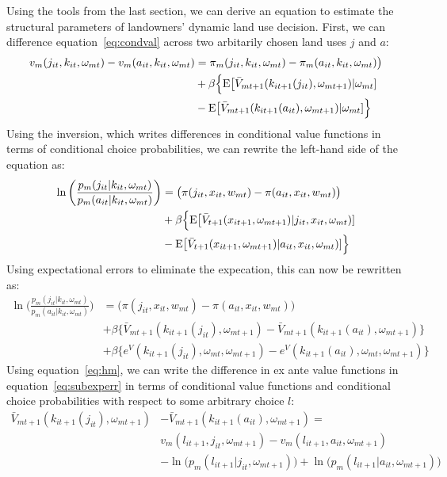 \documentclass[11pt]{article}
\newcommand{\Exp}{\textnormal{E}}
\begin{document}
Using the tools from the last section, we can derive an equation to estimate the structural parameters of landowners' dynamic land use decision. First, we can difference equation~\ref{eq:condval} across two arbitarily chosen land uses $j$ and $a$:
\begin{align*}
v_m(j_{it}, k_{it},\omega_{mt}) - v_m(a_{it}, k_{it},\omega_{mt})  &= \pi_m(j_{it},k_{it},\omega_{mt}) - \pi_m(a_{it},k_{it},\omega_{mt}) \big) \\
	& + \beta \Big\{ \Exp\big[\bar{V}_{mt+1}(k_{it+1}(j_{it}),\omega_{mt+1}) | \omega_{mt}] \\ \nonumber
	& -  \Exp\big[\bar{V}_{mt+1}(k_{it+1}(a_{it}),\omega_{mt+1}) | \omega_{mt}] \Big\} \nonumber
\end{align*}
Using the \citet{hotzmiller} inversion, which writes differences in conditional value functions in terms of conditional choice probabilities, we can rewrite the left-hand side of the equation as:
\begin{align} \label{eq:subhm}
\ln\bigg(\frac{p_m(j_{it}|k_{it},\omega_{mt})}{p_m(a_{it}|k_{it},\omega_{mt})}\bigg) &= \big(\pi(j_{it},x_{it},w_{mt}) - \pi(a_{it},x_{it},w_{mt})\big) \\
	& + \beta \Big\{ \Exp\big[\bar{V}_{t+1}(x_{it+1},\omega_{mt+1}) | j_{it}, x_{it}, \omega_{mt})] \nonumber\\ 
	& -  \Exp\big[\bar{V}_{t+1}(x_{it+1},\omega_{mt+1}) | a_{it}, x_{it}, \omega_{mt})] \Big\} \nonumber
\end{align} 
Using expectational errors to eliminate the expecation, this can now be rewritten as:
\begin{align}  \label{eq:subexperr}
\ln\bigg(\frac{p_m(j_{it}|k_{it},\omega_{mt})}{p_m(a_{it}|k_{it},\omega_{mt})}\bigg) &= \big(\pi(j_{it},x_{it},w_{mt}) - \pi(a_{it},x_{it},w_{mt})\big) \\
	& + \beta \Big\{\bar{V}_{mt+1}(k_{it+1}(j_{it}),\omega_{mt+1}) -  \bar{V}_{mt+1}(k_{it+1}(a_{it}),\omega_{mt+1})\Big\} \nonumber \\ 
	& + \beta \Big\{e^V(k_{it+1}(j_{it}),\omega_{mt},\omega_{mt+1}) -  e^V(k_{it+1}(a_{it}),\omega_{mt},\omega_{mt+1})\Big\} \nonumber
\end{align}
Using equation~\ref{eq:hm}, we can write the difference in ex ante value functions in equation~\ref{eq:subexperr} in terms of conditional value functions and conditional choice probabilities with respect to some arbitrary choice $l$:
\begin{align}  \label{eq:diffexante}
\bar{V}_{mt+1}(k_{it+1}(j_{it}),\omega_{mt+1})& -  \bar{V}_{mt+1}(k_{it+1}(a_{it}),\omega_{mt+1}) = \\ \nonumber
& v_m(l_{it+1},j_{it},\omega_{mt+1}) - v_m(l_{it+1},a_{it},\omega_{mt+1})\\ 
& - \ln\big(p_m(l_{it+1}|j_{it},\omega_{mt+1})\big) + \ln\big(p_m(l_{it+1}|a_{it},\omega_{mt+1})\big) \nonumber
\end{align}
\end{document}
